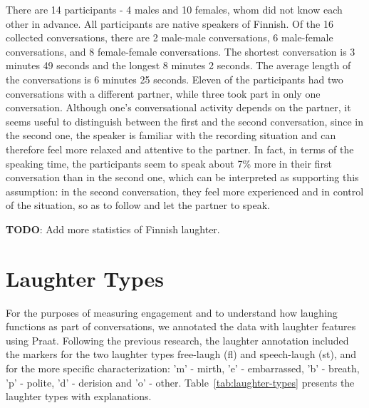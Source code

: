 \documentclass[10pt,journal,compsoc]{IEEEtran}
\begin{document}
There are 14 participants - 4 males and 10 females, whom did not know each other in advance. All participants are native speakers of Finnish. Of the 16 collected conversations, there are 2 male-male conversations, 6 male-female conversations, and 8 female-female conversations. The shortest conversation is 3 minutes 49 seconds and the longest 8 minutes 2 seconds. The average length of the conversations is 6 minutes 25 seconds. Eleven of the participants had two conversations with a different partner, while three took part in only one conversation. Although one’s conversational activity depends on the partner, it seems useful to distinguish between the first and the second conversation, since in the second one, the speaker is familiar with the recording situation and can therefore feel more relaxed and attentive to the partner. In fact, in terms of the speaking time, the participants seem to speak about 7\% more in their first conversation than in the second one, which can be interpreted as supporting this assumption: in the second conversation, they feel more experienced and in control of the situation, so as to follow and let the partner to speak.

\textbf{TODO}: Add more statistics of Finnish laughter.

\section{Laughter Types}
\label{sec:laughter-types}

For the purposes of measuring engagement and to understand how laughing functions as part of conversations, we annotated the data with laughter features using Praat. Following the previous research, the laughter annotation included the markers for the two laughter types free-laugh (fl) and speech-laugh (st), and for the more specific characterization: 'm' - mirth, 'e' - embarrassed, 'b' - breath, 'p' - polite, 'd' - derision and 'o' - other. Table~\ref{tab:laughter-types} presents the laughter types with explanations.
\end{document}
